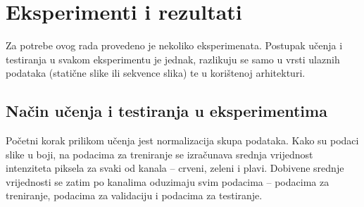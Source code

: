 \documentclass[times, utf8, diplomski, numeric]{fer}
\begin{document}
\chapter{Eksperimenti i rezultati}
Za potrebe ovog rada provedeno je nekoliko eksperimenata. 
Postupak učenja i testiranja u svakom eksperimentu je jednak, razlikuju se samo u vrsti ulaznih podataka (statične slike ili sekvence slika) te u korištenoj arhitekturi.

\section{Način učenja i testiranja u eksperimentima}
Početni korak prilikom učenja jest normalizacija skupa podataka.
Kako su podaci slike u boji, na podacima za treniranje se izračunava srednja vrijednost intenziteta piksela za svaki od kanala -- crveni, zeleni i plavi.
Dobivene srednje vrijednosti se zatim po kanalima oduzimaju svim podacima -- podacima za treniranje, podacima za validaciju i podacima za testiranje.
\end{document}
